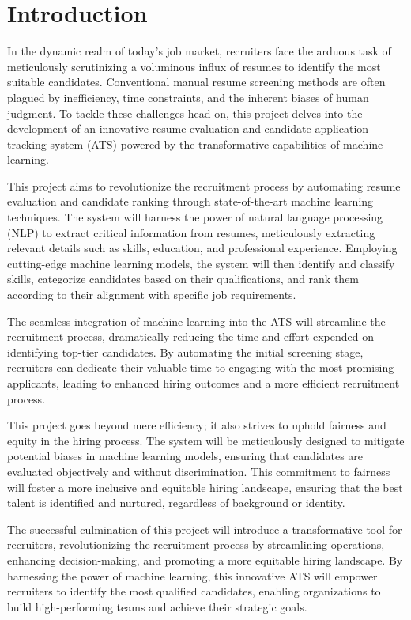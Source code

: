 \chapter{Introduction}
In the dynamic realm of today's job market, recruiters face the arduous task of meticulously scrutinizing a voluminous influx of resumes to identify the most suitable candidates. Conventional manual resume screening methods are often plagued by inefficiency, time constraints, and the inherent biases of human judgment. To tackle these challenges head-on, this project delves into the development of an innovative resume evaluation and candidate application tracking system (ATS) powered by the transformative capabilities of machine learning.

This project aims to revolutionize the recruitment process by automating resume evaluation and candidate ranking through state-of-the-art machine learning techniques. The system will harness the power of natural language processing (NLP) to extract critical information from resumes, meticulously extracting relevant details such as skills, education, and professional experience. Employing cutting-edge machine learning models, the system will then identify and classify skills, categorize candidates based on their qualifications, and rank them according to their alignment with specific job requirements.

The seamless integration of machine learning into the ATS will streamline the recruitment process, dramatically reducing the time and effort expended on identifying top-tier candidates. By automating the initial screening stage, recruiters can dedicate their valuable time to engaging with the most promising applicants, leading to enhanced hiring outcomes and a more efficient recruitment process.

This project goes beyond mere efficiency; it also strives to uphold fairness and equity in the hiring process. The system will be meticulously designed to mitigate potential biases in machine learning models, ensuring that candidates are evaluated objectively and without discrimination. This commitment to fairness will foster a more inclusive and equitable hiring landscape, ensuring that the best talent is identified and nurtured, regardless of background or identity.

The successful culmination of this project will introduce a transformative tool for recruiters, revolutionizing the recruitment process by streamlining operations, enhancing decision-making, and promoting a more equitable hiring landscape. By harnessing the power of machine learning, this innovative ATS will empower recruiters to identify the most qualified candidates, enabling organizations to build high-performing teams and achieve their strategic goals.

